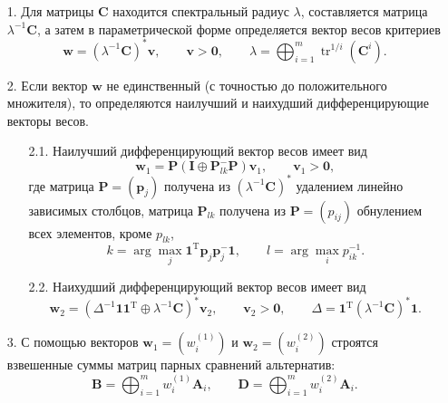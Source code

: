 \documentclass[specialist,
substylefile = spbu.rtx,
               subf,href,colorlinks=true, 12pt]{disser}
\begin{document}
    \begin{itemize}
        \item[1.]
        Для матрицы $\bm{C}$ находится спектральный радиус $\lambda$, составляется матрица $\lambda^{-1}\bm{C}$, а затем в параметрической форме определяется вектор весов критериев
        $$
        \bm{w}
        =
        (\lambda^{-1}\bm{C})^{\ast}\bm{v},
        \qquad
        \bm{v}>\bm{0},
        \qquad
        \lambda
        =
        \bigoplus_{i=1}^{m}{\mathop\mathrm{tr}}^{1/i}(\bm{C}^{i}).
        $$
        \item[2.]
        Если вектор $\bm{w}$ не единственный (с точностью до положительного множителя), то определяются наилучший и наихудший дифференцирующие векторы весов.
        \begin{itemize}
            \item[2.1.]
            Наилучший дифференцирующий вектор весов имеет вид
            $$
            \bm{w}_{1}
            =
            \bm{P}(\bm{I}\oplus\bm{P}_{lk}^{-}\bm{P})\bm{v}_{1},
            \qquad
            \bm{v}_{1}
            >
            \bm{0},
            $$
            где матрица $\bm{P}=(\bm{p}_{j})$ получена из $(\lambda^{-1}\bm{C})^{\ast}$ удалением линейно зависимых столбцов, матрица $\bm{P}_{lk}$ получена из $\bm{P}=(p_{ij})$ обнулением всех элементов, кроме $p_{lk}$,
            $$
            k
            =
            \arg\max_{j}\bm{1}^{\mathrm{T}}\bm{p}_{j}\bm{p}_{j}^{-}\bm{1},
            \qquad
            l
            =
            \arg\max_{i}p_{ik}^{-1}.
            $$
            \item[2.2.]
            Наихудший дифференцирующий вектор весов имеет вид
            $$
            \bm{w}_{2}
            =
            (\Delta^{-1}\bm{1}\bm{1}^{\mathrm{T}}\oplus\lambda^{-1}\bm{C})^{\ast}\bm{v}_{2},
            \qquad
            \bm{v}_{2}
            >
            \bm{0},
            \qquad
            \Delta
            =
            \bm{1}^{\mathrm{T}}(\lambda^{-1}\bm{C})^{\ast}\bm{1}.
            $$
        \end{itemize}
        \item[3.]
        С помощью векторов $\bm{w}_{1}=(w_{i}^{(1)})$ и $\bm{w}_{2}=(w_{i}^{(2)})$ строятся взвешенные суммы матриц парных сравнений альтернатив:
        $$
        \bm{B}
        =
        \bigoplus_{i=1}^{m}w^{(1)}_{i}\bm{A}_{i},
        \qquad
        \bm{D}
        =
        \bigoplus_{i=1}^{m}w^{(2)}_{i}\bm{A}_{i}.
        $$
        

\end{itemize}
\end{document}
